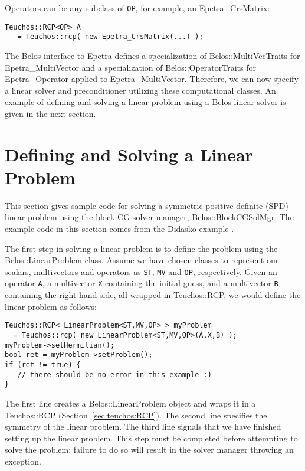 \noindent Operators can be any subclass of \verb!OP!, for example, an Epetra\_CrsMatrix:
\begin{verbatim}
Teuchos::RCP<OP> A 
   = Teuchos::rcp( new Epetra_CrsMatrix(...) );
\end{verbatim}

The Belos interface to Epetra defines a specialization of
Belos::MultiVecTraits for Epetra\_MultiVector and a
specialization of Belos::OperatorTraits for Epetra\_Operator
applied to Epetra\_MultiVector. Therefore, we can now specify a
linear solver and preconditioner utilizing these computational classes. 
An example of defining and solving a linear problem using a Belos
linear solver is given in the next section.


\section{Defining and Solving a Linear Problem}
\label{sec:belos:example}

This section gives sample code for solving a symmetric positive definite (SPD)
linear problem using the block CG solver manager, Belos::BlockCGSolMgr. 
The example code in this section comes from the Didasko example .

The first step in solving a linear problem is to define the problem using the
Belos::LinearProblem class.  Assume we have chosen classes to represent our scalars, 
multivectors and operators as \verb!ST!, \verb!MV! and \verb!OP!, respectively. Given an
operator \verb!A!, a multivector \verb!X! containing the initial guess, and a multivector
\verb!B! containing the right-hand side, all wrapped in Teuchos::RCP, 
we would define the linear problem as follows:
\begin{verbatim}
Teuchos::RCP< LinearProblem<ST,MV,OP> > myProblem 
  = Teuchos::rcp( new LinearProblem<ST,MV,OP>(A,X,B) );
myProblem->setHermitian();
bool ret = myProblem->setProblem();
if (ret != true) {
   // there should be no error in this example :)
}
\end{verbatim}

The first line creates a Belos::LinearProblem object and wraps it in a
Teuchos::\-RCP (Section~\ref{sec:teuchos:RCP}). The second line
specifies the symmetry of the linear problem. The third line signals that we have
finished setting up the linear problem. This step must be completed before
attempting to solve the problem; failure to do so will result in the solver manager
throwing an exception.

